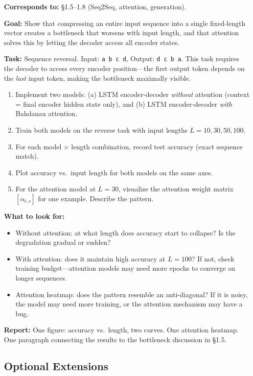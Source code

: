 \textbf{Corresponds to:} \S1.5--1.8 (Seq2Seq, attention, generation).

\textbf{Goal:} Show that compressing an entire input sequence into a single fixed-length vector creates a bottleneck that worsens with input length, and that attention solves this by letting the decoder access all encoder states.

\textbf{Task:} Sequence reversal. Input: \texttt{a b c d}, Output: \texttt{d c b a}. This task requires the decoder to access every encoder position---the first output token depends on the \emph{last} input token, making the bottleneck maximally visible.

\begin{enumerate}[nosep]
    \item Implement two models: (a) LSTM encoder-decoder \emph{without} attention (context = final encoder hidden state only), and (b) LSTM encoder-decoder \emph{with} Bahdanau attention.
    \item Train both models on the reverse task with input lengths $L = 10, 30, 50, 100$.
    \item For each model $\times$ length combination, record test accuracy (exact sequence match).
    \item Plot accuracy vs.\ input length for both models on the same axes.
    \item For the attention model at $L = 30$, visualize the attention weight matrix $[\alpha_{t,s}]$ for one example. Describe the pattern.
\end{enumerate}

\textbf{What to look for:}
\begin{itemize}[nosep]
    \item Without attention: at what length does accuracy start to collapse? Is the degradation gradual or sudden?
    \item With attention: does it maintain high accuracy at $L = 100$? If not, check training budget---attention models may need more epochs to converge on longer sequences.
    \item Attention heatmap: does the pattern resemble an anti-diagonal? If it is noisy, the model may need more training, or the attention mechanism may have a bug.
\end{itemize}

\textbf{Report:} One figure: accuracy vs.\ length, two curves. One attention heatmap. One paragraph connecting the results to the bottleneck discussion in \S1.5.

\subsection*{Optional Extensions}

